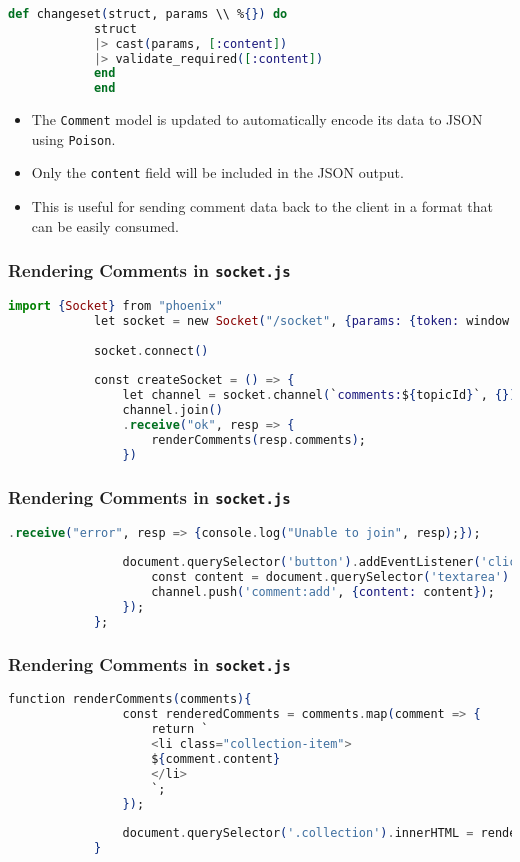\documentclass[aspectratio=169, table]{beamer}
\begin{document}
	\begin{frame}[fragile]
		\frametitle{}
		\begin{lstlisting}[language=Elixir]
			def changeset(struct, params \\ %{}) do
			struct
			|> cast(params, [:content])
			|> validate_required([:content])
			end
			end 
		\end{lstlisting}
		\begin{itemize}
			\item The \texttt{Comment} model is updated to automatically encode its data to JSON using \texttt{Poison}.
			\item Only the \texttt{content} field will be included in the JSON output.
			\item This is useful for sending comment data back to the client in a format that can be easily consumed.
		\end{itemize}
	\end{frame}
	
	\begin{frame}[fragile]
		\frametitle{Rendering Comments in \texttt{socket.js}}
		\begin{lstlisting}[language=Elixir]
			import {Socket} from "phoenix"
			let socket = new Socket("/socket", {params: {token: window.userToken}})
			
			socket.connect()
			
			const createSocket = () => {
				let channel = socket.channel(`comments:${topicId}`, {})
				channel.join()
				.receive("ok", resp => {
					renderComments(resp.comments);
				})
		\end{lstlisting}
	\end{frame}
	
	\begin{frame}[fragile]
		\frametitle{Rendering Comments in \texttt{socket.js}}
		\begin{lstlisting}[language=Elixir]
				.receive("error", resp => {console.log("Unable to join", resp);});
				
				document.querySelector('button').addEventListener('click', () => {
					const content = document.querySelector('textarea').value;
					channel.push('comment:add', {content: content});
				});
			};
		\end{lstlisting}
	\end{frame}
	
	\begin{frame}[fragile]
		\frametitle{Rendering Comments in \texttt{socket.js}}
		\begin{lstlisting}[language=Elixir]
			function renderComments(comments){
				const renderedComments = comments.map(comment => {
					return `
					<li class="collection-item">
					${comment.content}
					</li>
					`;
				});
				
				document.querySelector('.collection').innerHTML = renderedComments.join('');
			}
		\end{lstlisting}
	\end{frame}
	
\end{document}
